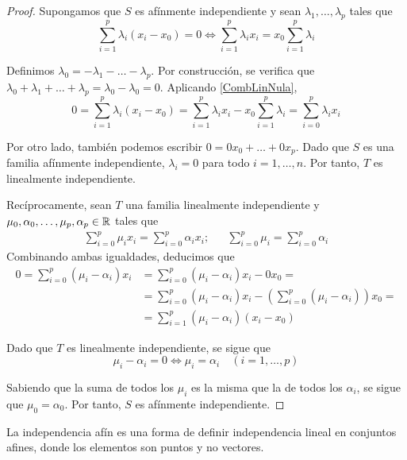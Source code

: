 \begin{proof}
Supongamos que $S$ es afínmente independiente y sean $\lambda_1,\dots,
\lambda_p$ tales que
\begin{equation}
\label{CombLinNula}
\sum^p_{i=1}\lambda_i(x_i-x_0)=0 \iff
\sum^p_{i=1}\lambda_ix_i=x_0\sum^p_{i=1}\lambda_i
\end{equation}

Definimos $\lambda_0=-\lambda_1-\dots-\lambda_p$. Por construcción, se
verifica que $\lambda_0+\lambda_1+\dots+\lambda_p=\lambda_0-\lambda_0=0$.
Aplicando \eqref{CombLinNula},
\[0=\sum^p_{i=1}\lambda_i(x_i-x_0)=
\sum^p_{i=1}\lambda_i x_i-x_0\sum^p_{i=1}\lambda_i=
\sum^p_{i=0}\lambda_i x_i\]

Por otro lado, también podemos escribir $0=0x_0+\dots+0x_p$. Dado que $S$ es una
familia afínmente independiente, $\lambda_i=0$ para todo $i=1,\dots,n$.
Por tanto, $T$ es linealmente independiente.

Recíprocamente, sean $T$ una familia linealmente independiente y\\
$\mu_0,\alpha_0,\dots,\mu_p,\alpha_p \in \mathbb{R}$ tales que
\begin{align*}
\sum_{i=0}^p \mu_ix_i=\sum_{i=0}^p \alpha_ix_i;
&&
\sum_{i=0}^p \mu_i=\sum_{i=0}^p \alpha_i
\end{align*}
Combinando ambas igualdades, deducimos que
\begin{align*}
0=\sum^p_{i=0}(\mu_i-\alpha_i)x_i
	&=\sum^p_{i=0}(\mu_i-\alpha_i)x_i-0x_0=\\
	&=\sum^p_{i=0}(\mu_i-\alpha_i)x_i-
	\left(\sum^p_{i=0}(\mu_i-\alpha_i)\right)x_0=\\
	&=\sum^p_{i=1}(\mu_i-\alpha_i)(x_i-x_0)
\end{align*}

Dado que $T$ es linealmente independiente, se sigue que
\[\mu_i-\alpha_i=0 \iff \mu_i=\alpha_i \quad (i=1,\dots, p)\]

Sabiendo que la suma de todos los $\mu_i$ es la misma que la de todos los
$\alpha_i$, se sigue que $\mu_0=\alpha_0$. Por tanto, $S$ es afínmente
independiente.
\end{proof}

\begin{marginfigure}
\caption[Puntos afínmente independientes]{La independencia afín es una forma de
definir independencia lineal en conjuntos afines, donde los elementos son puntos
y no vectores.}
\end{marginfigure}

